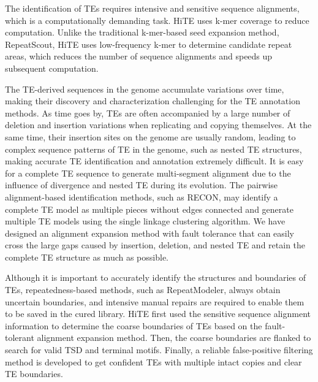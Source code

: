\documentclass{bmcart}
\begin{document}
The identification of TEs requires intensive and sensitive sequence alignments, which is a computationally demanding task. HiTE uses k-mer coverage to reduce computation. Unlike the traditional k-mer-based seed expansion method, RepeatScout, HiTE uses low-frequency k-mer to determine candidate repeat areas, which reduces the number of sequence alignments and speeds up subsequent computation. 

The TE-derived sequences in the genome accumulate variations over time, making their discovery and characterization challenging for the TE annotation methods. As time goes by, TEs are often accompanied by a large number of deletion and insertion variations when replicating and copying themselves. At the same time, their insertion sites on the genome are usually random, leading to complex sequence patterns of TE in the genome, such as nested TE structures, making accurate TE identification and annotation extremely difficult. It is easy for a complete TE sequence to generate multi-segment alignment due to the influence of divergence and nested TE during its evolution. The pairwise alignment-based identification methods, such as RECON, may identify a complete TE model as multiple pieces without edges connected and generate multiple TE models using the single linkage clustering algorithm. We have designed an alignment expansion method with fault tolerance that can easily cross the large gaps caused by insertion, deletion, and nested TE and retain the complete TE structure as much as possible.

Although it is important to accurately identify the structures and boundaries of TEs, repeatedness-based methods, such as RepeatModeler\cite{Smit2008repeatmodeler}, always obtain uncertain boundaries, and intensive manual repairs are required to enable them to be saved in the cured library\cite{storer2022methodologies}. HiTE first used the sensitive sequence alignment information to determine the coarse boundaries of TEs based on the fault-tolerant alignment expansion method. Then, the coarse boundaries are flanked to search for valid TSD and terminal motifs. Finally, a reliable false-positive filtering method is developed to get confident TEs with multiple intact copies and clear TE boundaries.
\end{document}
